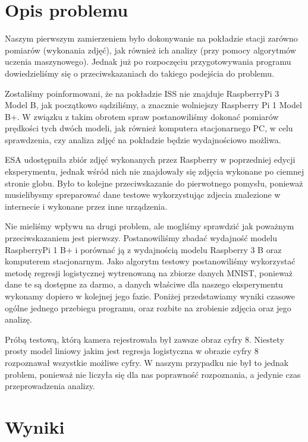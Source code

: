 \section{Opis problemu}\label{sec:performance_introduction}

Naszym pierwszym zamierzeniem było dokonywanie na pokładzie stacji zarówno pomiarów
(wykonania zdjęć), jak również ich analizy (przy pomocy algorytmów uczenia maszynowego). Jednak już po
rozpoczęciu przygotowywania programu dowiedzieliśmy się o przeciwskazaniach do takiego
podejścia do problemu.

Zostaliśmy poinformowani, że na pokładzie ISS nie znajduje RaspberryPi 3
Model B, jak początkowo sądziliśmy, a znacznie wolniejszy Raspberry Pi 1 Model B+. W związku
z takim obrotem spraw postanowiliśmy dokonać pomiarów prędkości tych dwóch modeli, jak
również komputera stacjonarnego PC, w celu sprawdzenia, czy analiza zdjęć na pokładzie będzie
wydajnościowo możliwa.

ESA udostępniła zbiór zdjęć wykonanych przez Raspberry w poprzedniej edycji eksperymentu, jednak
wśród nich nie znajdowały się zdjęcia wykonane po ciemnej stronie globu. Było to kolejne przeciwskazanie
do pierwotnego pomysłu, ponieważ musielibysmy spreparować dane testowe wykorzystując zdjecia znalezione
w internecie i wykonane przez inne urządzenia.

Nie mieliśmy wpływu na drugi problem, ale mogliśmy sprawdzić jak poważnym przeciwskazaniem jest pierwszy.
Postanowiliśmy zbadać wydajność modelu RaspberryPi 1 B+ i porównać ją z wydajnością modelu Raspberry 3 B oraz
komputerem stacjonarnym. Jako algorytm testowy postanowiliśmy wykorzystać metodę regresji logistycznej
wytrenowaną na zbiorze danych MNIST, ponieważ dane te są dostępne za darmo, a danych właściwe dla naszego
eksperymentu wykonamy dopiero w kolejnej jego fazie. Poniżej przedstawiamy wyniki czasowe ogólne jednego
przebiegu programu, oraz rozbite na zrobienie zdjęcia oraz jego analizę.

Próbą testową, którą kamera rejestrowała był zawsze obraz cyfry 8. Niestety prosty model liniowy jakim jest
regresja logistyczna w obrazie cyfry 8 rozpoznawał wszystkie możliwe cyfry. W naszym przypadku nie był to
jednak problem, ponieważ nie liczyła się dla nas poprawność rozpoznania, a jedynie czas przeprowadzenia analizy.

\section{Wyniki}\label{sec:performance_results}

